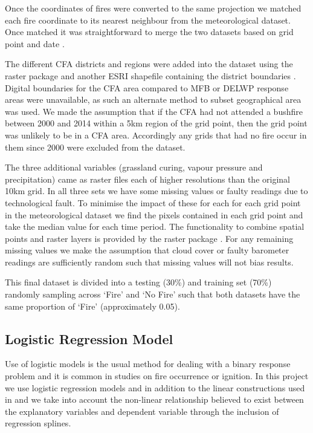 \documentclass[11pt,a4paper]{article}
\begin{document}
Once the coordinates of fires were converted to the same projection we matched each fire coordinate to its nearest neighbour from the meteorological dataset. Once matched it was straightforward to merge the two datasets based on grid point and date \citep{datatable}.

The different CFA districts and regions were added into the dataset using the raster package and another ESRI shapefile containing the district boundaries \citep{raster}.
Digital boundaries for the CFA area compared to MFB or DELWP response areas were unavailable, as such an alternate method to subset geographical area was used. We made the assumption that if the CFA had not attended a bushfire between 2000 and 2014 within a 5km region of the grid point, then the grid point was unlikely to be in a CFA area. Accordingly any grids that had no fire occur in them since 2000 were excluded from the dataset.

The three additional variables (grassland curing, vapour pressure and precipitation) came as raster files each of higher resolutions than the original 10km grid. In all three sets we have some missing values or faulty readings due to technological fault. To minimise the impact of these for each for each grid point in the meteorological dataset we find the pixels contained in each grid point and take the median value for each time period. The functionality to combine spatial points and raster layers is provided by the raster package \citep{raster}. For any remaining missing values we make the assumption that cloud cover or faulty barometer readings are sufficiently random such that missing values will not bias results.


This final dataset is divided into a testing (30\%) and training set (70\%) randomly sampling across `Fire' and `No Fire' such that both datasets have the same proportion of `Fire' (approximately 0.05).

\subsection{Logistic Regression Model}

Use of logistic models is the usual method for dealing with a binary response problem and it is common in studies on fire occurrence or ignition.  In this project we use logistic regression models and in addition to the linear constructions used in \citet{andrews03} and \citet{del11} we take into account the non-linear relationship believed to exist between the explanatory variables and dependent variable through the inclusion of regression splines.
\end{document}

